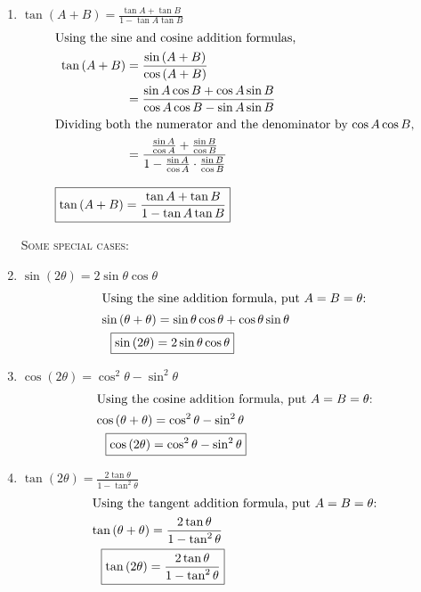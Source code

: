 \documentclass{article}
\begin{document}
\begin{enumerate}
    \item $\tan\left(A + B\right) = \frac{\tan A + \tan B}{1-\tan A \tan B}$
    \begin{align*}
        \intertext{Using the sine and cosine addition formulas,}
        \tan\left(A+B\right) &= \frac{\sin\left(A+B\right)}{\cos\left(A+B\right)}\\
        &= \frac{\sin A\cos B + \cos A\sin B}{\cos A\cos B - \sin A\sin B}\\
        \intertext{Dividing both the numerator and the denominator by \(\cos A\cos B\),}
        &= \frac{\frac{\sin A}{\cos A} + \frac{\sin B}{\cos B}}{1 - \frac{\sin A}{\cos A} \cdot \frac{\sin B}{\cos B}}\\[3mm]
        \Aboxed{\tan\left(A + B\right)&= \frac{\tan A + \tan B}{1 - \tan A \tan B}}
    \end{align*}

    \begin{center}
        \textsc{Some special cases:}
    \end{center}
    \item $\sin\left(2\theta\right) = 2\sin \theta\cos \theta$
    \begin{align*}
        \intertext{Using the sine addition formula, put \(A = B = \theta\):}
        \sin\left(\theta + \theta\right) &= \sin \theta \cos \theta + \cos \theta \sin \theta\\
        \Aboxed{\sin\left(2\theta\right) &= 2\sin \theta \cos \theta}
    \end{align*}

    \item $\cos\left(2\theta\right) = \cos^2 \theta - \sin^2 \theta$
    \begin{align*}
        \intertext{Using the cosine addition formula, put \(A = B = \theta\):}
        \cos\left(\theta + \theta\right) &= \cos^2 \theta - \sin^2 \theta\\
        \Aboxed{\cos\left(2\theta\right) &= \cos^2 \theta - \sin^2 \theta}
    \end{align*}

    \item $\tan\left(2\theta\right) = \frac{2\tan \theta}{1-\tan^2 \theta}$
    \begin{align*}
        \intertext{Using the tangent addition formula, put \(A = B = \theta\):}
        \tan\left(\theta + \theta\right) &= \frac{2\tan \theta}{1-\tan^2 \theta}\\
        \Aboxed{\tan\left(2\theta\right) &= \frac{2\tan \theta}{1-\tan^2 \theta}}
    \end{align*}
\end{enumerate}
\end{document}
